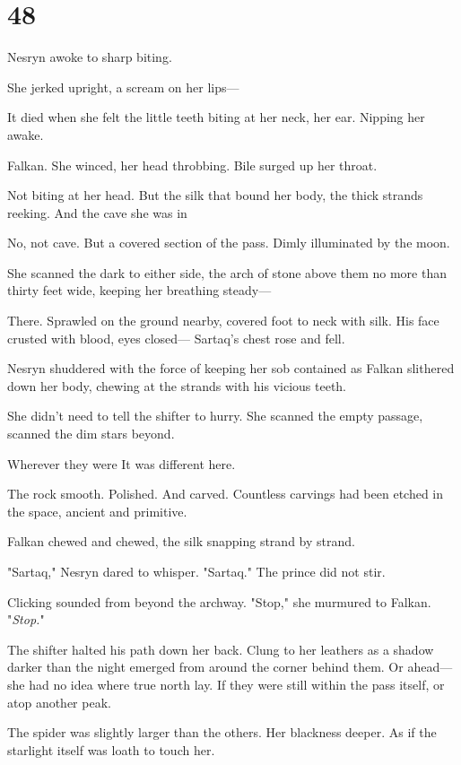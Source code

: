 
\chapter{48}

Nesryn awoke to sharp biting.

She jerked upright, a scream on her lips---

It died when she felt the little teeth biting at her neck, her ear. Nipping her awake.

Falkan. She winced, her head throbbing. Bile surged up her throat.

Not biting at her head. But the silk that bound her body, the thick strands reeking. And the cave she was in 

No, not cave. But a covered section of the pass. Dimly illuminated by the moon.

She scanned the dark to either side, the arch of stone above them no more than thirty feet wide, keeping her breathing steady---

There. Sprawled on the ground nearby, covered foot to neck with silk. His face crusted with blood, eyes closed--- Sartaq's chest rose and fell.

Nesryn shuddered with the force of keeping her sob contained as Falkan slithered down her body, chewing at the strands with his vicious teeth.

She didn't need to tell the shifter to hurry. She scanned the empty passage, scanned the dim stars beyond.

Wherever they were  It was different here.

The rock smooth. Polished. And carved. Countless carvings had been etched in the space, ancient and primitive.

Falkan chewed and chewed, the silk snapping strand by strand.

"Sartaq," Nesryn dared to whisper. "Sartaq." The prince did not stir.

Clicking sounded from beyond the archway. "Stop," she murmured to Falkan. "\emph{Stop.}"

The shifter halted his path down her back. Clung to her leathers as a shadow darker than the night emerged from around the corner behind them. Or ahead--- she had no idea where true north lay. If they were still within the pass itself, or atop another peak.

The spider was slightly larger than the others. Her blackness deeper. As if the starlight itself was loath to touch her.

